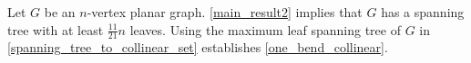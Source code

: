 Let $G$ be an $n$-vertex planar graph. \cref{main_result2} implies that $G$ has a spanning tree with at least $\frac{11}{21}n$ leaves. Using the maximum leaf spanning tree of $G$ in \cref{spanning_tree_to_collinear_set} establishes \cref{one_bend_collinear}.


